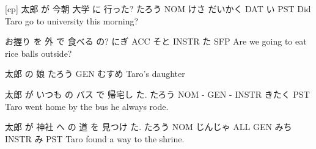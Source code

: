 [cp]
太郎   が  今朝 大学    に   行った?
たろう NOM けさ だいかく DAT い PST
Did Taro go to university this morning?

お握り を   外  で      食べる の?
にぎ   ACC そと INSTR  た SFP
Are we going to eat rice balls outside?

太郎   の   娘
たろう GEN むすめ
Taro's daughter

太郎   が いつも の  バス で    帰宅し た.
たろう NOM -    GEN -   INSTR きたく PST
Taro went home by the bus he always rode.

太郎   が  神社    へ   の  道   を    見つけ た.
たろう NOM じんじゃ ALL GEN みち INSTR み    PST
Taro found a way to the shrine.
